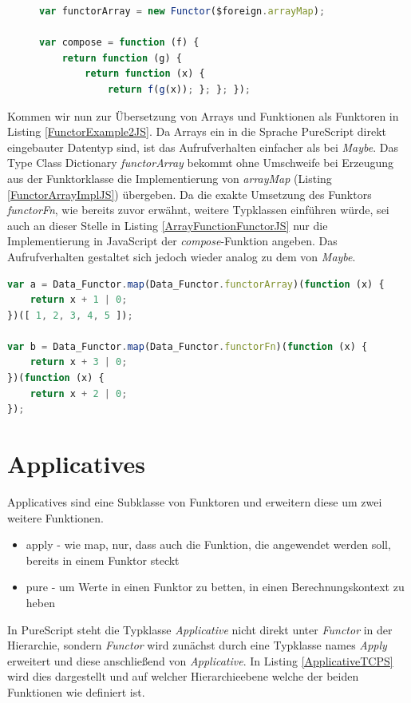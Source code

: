 \documentclass[
12pt,
ngerman,
oneside]
{scrbook} %
\begin{document}
 \begin{figure}
	\begin{lstlisting}[aboveskip=-1em, language=javascript, caption=Auszug Funktor Array u. Function, label=ArrayFunctionFunctorJS]
var functorArray = new Functor($foreign.arrayMap);

var compose = function (f) {
	return function (g) {
		return function (x) {
			return f(g(x)); }; }; });	
	\end{lstlisting}
\end{figure}

Kommen wir nun zur Übersetzung von Arrays und Funktionen als Funktoren in Listing \ref{FunctorExample2JS}. Da Arrays ein in die Sprache PureScript direkt eingebauter Datentyp sind, ist das Aufrufverhalten einfacher als bei \emph{Maybe}. Das Type Class Dictionary \emph{functorArray} bekommt ohne Umschweife bei Erzeugung aus der Funktorklasse die Implementierung von \emph{arrayMap} (Listing \ref{FunctorArrayImplJS}) übergeben. Da die exakte Umsetzung des Funktors \emph{functorFn}, wie bereits zuvor erwähnt, weitere Typklassen einführen würde, sei auch an dieser Stelle in Listing \ref{ArrayFunctionFunctorJS} nur die Implementierung in JavaScript der \emph{compose}-Funktion angeben. Das Aufrufverhalten gestaltet sich jedoch wieder analog zu dem von \emph{Maybe}.

\begin{lstlisting}[language=javascript, style=numbered-and-boxed, caption=Übersetzung des Beispiels mit Array und Funktion als Funktor nach JS, label=FunctorExample2JS]
var a = Data_Functor.map(Data_Functor.functorArray)(function (x) {
	return x + 1 | 0;
})([ 1, 2, 3, 4, 5 ]);

var b = Data_Functor.map(Data_Functor.functorFn)(function (x) {
	return x + 3 | 0;
})(function (x) {
	return x + 2 | 0;
});
\end{lstlisting}

\section{Applicatives}
Applicatives sind eine Subklasse von Funktoren und erweitern diese um zwei weitere Funktionen.
\begin{itemize}
	\item apply - wie map, nur, dass auch die Funktion, die angewendet werden soll, bereits in einem Funktor steckt \cite[][S. 84]{Freeman17}
	\item pure - um Werte in einen Funktor zu betten, in einen Berechnungskontext zu heben \cite[][S. 86]{Freeman17}
\end{itemize}
In PureScript steht die Typklasse \emph{Applicative} nicht direkt unter \emph{Functor} in der Hierarchie, sondern \emph{Functor} wird zunächst durch eine Typklasse names \emph{Apply} erweitert und diese anschließend von \emph{Applicative}. In Listing \ref{ApplicativeTCPS} wird dies dargestellt und auf welcher Hierarchieebene welche der beiden Funktionen wie definiert ist.
\end{document}
